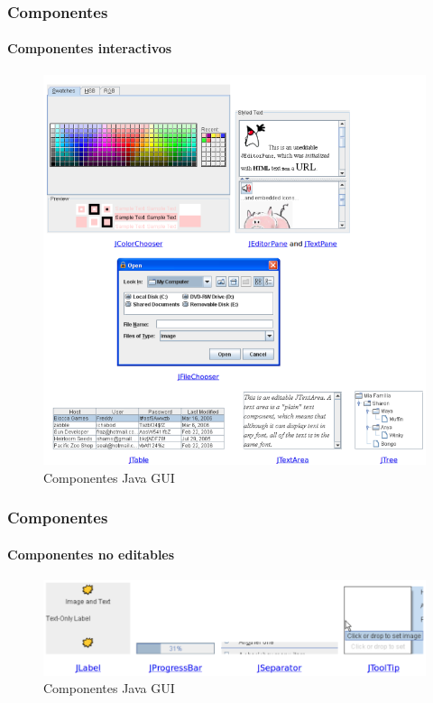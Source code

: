 \documentclass{beamer}
\begin{document}
\begin{frame}
\frametitle{Componentes}
\framesubtitle{Componentes interactivos}
\begin{figure}
\includegraphics[scale=0.35]{imagenes/componentes2.png}
\caption{Componentes Java GUI}
\end{figure}
\end{frame}

\begin{frame}
\frametitle{Componentes}
\framesubtitle{Componentes no editables}
\begin{figure}
\includegraphics[width=\textwidth]{imagenes/componentes3.png}
\caption{Componentes Java GUI}
\end{figure}
\end{frame}
\end{document}
